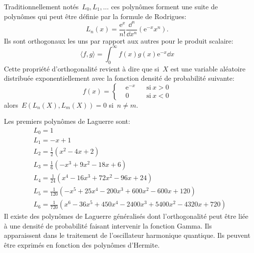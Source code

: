Traditionnellement notés~$L_0,L_1,\dots$ ces polynômes forment une suite de polynômes qui peut être définie par la formule de Rodrigues: 
\begin{equation}
 L_n(x)=\frac{\mathrm{e}^x}{n!}\frac{\dd^n}{\dd x^n}\left(\mathrm{e}^{-x} x^n\right). 
\end{equation}
Ils sont orthogonaux les uns par rapport aux autres pour le produit scalaire: 
\begin{equation}
\langle f,g \rangle = \int_0^\infty f(x) g(x) \mathrm{e}^{-x}\dd x 
\end{equation}
Cette propriété d'orthogonalité revient à dire que si~$X$ est une variable aléatoire distribuée exponentiellement avec la fonction densité de probabilité suivante: 
\begin{equation}
 f(x)=\left\{
\begin{aligned}
& \mathrm{e}^{-x} && \mbox{si}\ x>0\\
&0 && \mbox{si}\ x<0
\end{aligned}\right. 
\end{equation}
alors~$E(L_n(X),L_m(X))=0$ si~$n\neq m$. 

\noindent
Les premiers polynômes de Laguerre sont:
\begin{equation}
\begin{aligned}
&L_0 =	1\\
&L_1= 	-x+1\\
&L_2= 	\frac12 (x^2-4x+2)\\
&L_3= 	\frac16 (-x^3+9x^2-18x+6)\\
&L_4= 	\frac1{24} (x^4-16x^3+72x^2-96x+24)\\
&L_5= 	\frac1{120} (-x^5+25x^4-200x^3+600x^2-600x+120)\\
&L_6= 	\frac1{720} (x^6-36x^5+450x^4-2400x^3+5400x^2-4320x+720)
\end{aligned}
\end{equation}
Il existe des polynômes de Laguerre généralisés dont l'orthogonalité peut être liée à une densité de probabilité faisant intervenir la fonction Gamma. Ils apparaissent dans le traitement de l'oscillateur harmonique quantique. Ils peuvent être exprimés en fonction des polynômes d'Hermite. 

